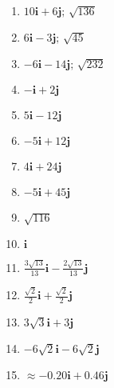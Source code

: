 \documentclass{article}
\begin{document}
\begin{enumerate}
\item $10\textbf{i}+6\textbf{j}; \, \sqrt{136}$    
\item $6\textbf{i}-3\textbf{j}; \, \sqrt{45}$       
\item $-6\textbf{i}-14\textbf{j}; \, \sqrt{232}$    
\item $-\textbf{i}+2\textbf{j}$     
\item $5\textbf{i}-12\textbf{j}$    
\item $-5\textbf{i}+12\textbf{j}$   
\item $4\textbf{i}+24\textbf{j}$    
\item $-5\textbf{i}+45\textbf{j}$  
\item $\sqrt{116}$                  
\item $\textbf{i}$                  
\item $\frac{3\sqrt{13}}{13}\textbf{i}-\frac{2\sqrt{13}}{13}\textbf{j}$    
\item $\frac{\sqrt{2}}{2}\textbf{i} + \frac{\sqrt{2}}{2}\textbf{j}$    
\item $3\sqrt{3}\textbf{i} + 3\textbf{j}$
\item $-6\sqrt{2}\textbf{i}-6\sqrt{2}\textbf{j}$    
\item $\approx -0.20\textbf{i}+0.46\textbf{j}$   
\end{enumerate}
\end{document}
